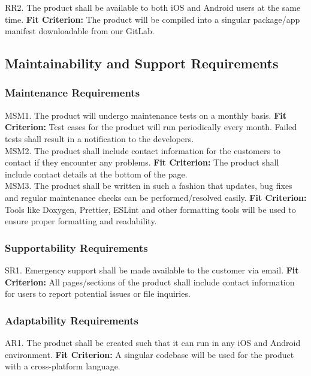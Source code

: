 \documentclass[12pt, titlepage]{article}
\begin{document}
\noindent RR2. The product shall be available to both iOS and Android users at the same time.
	\textbf{Fit Criterion:} The product will be compiled into a singular package/app manifest downloadable from our GitLab.

\subsection{Maintainability and Support Requirements}

\subsubsection{Maintenance Requirements}

MSM1. The product will undergo maintenance tests on a monthly basis.
	\textbf{Fit Criterion:} Test cases for the product will run periodically every month. Failed tests shall result in a notification to the developers.\\

\noindent MSM2. The product shall include contact information for the customers to contact if they encounter any problems.
	\textbf{Fit Criterion:}  The product shall include contact details at the bottom of the page.\\

\noindent MSM3. The product shall be written in such a fashion that updates, bug fixes and regular maintenance checks can be performed/resolved easily.
	\textbf{Fit Criterion:} Tools like Doxygen, Prettier, ESLint and other formatting tools will be used to ensure proper formatting and readability.

\subsubsection{Supportability Requirements}

SR1. Emergency support shall be made available to the customer via email.
	\textbf{Fit Criterion:} All pages/sections of the product shall include contact information for users to report potential issues or file inquiries. 

\subsubsection{Adaptability Requirements}

AR1. The product shall be created such that it can run in any iOS and Android environment.
	\textbf{Fit Criterion:} A singular codebase will be used for the product with a cross-platform language.
\end{document}
